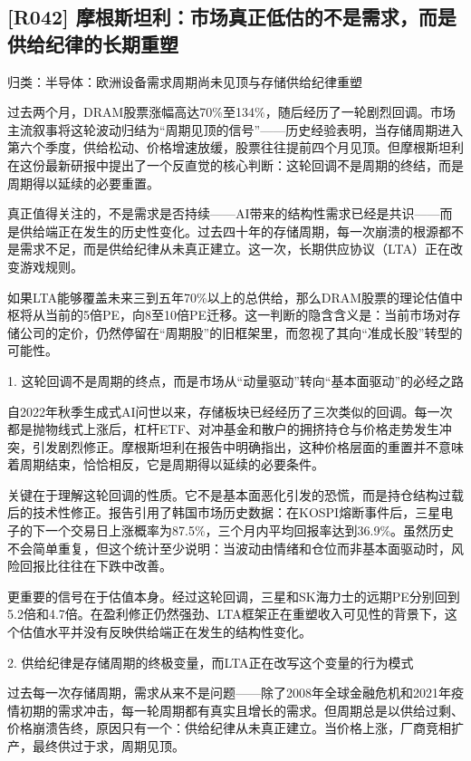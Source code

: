 \documentclass[11pt]{ctexart}
\begin{document}
\subsection{[R042] 摩根斯坦利：市场真正低估的不是需求，而是供给纪律的长期重塑}
{\small\color{refgray}归类：半导体：欧洲设备需求周期尚未见顶与存储供给纪律重塑}

过去两个月，DRAM股票涨幅高达70\%至134\%，随后经历了一轮剧烈回调。市场主流叙事将这轮波动归结为“周期见顶的信号”——历史经验表明，当存储周期进入第六个季度，供给松动、价格增速放缓，股票往往提前四个月见顶。但摩根斯坦利在这份最新研报中提出了一个反直觉的核心判断：这轮回调不是周期的终结，而是周期得以延续的必要重置。

真正值得关注的，不是需求是否持续——AI带来的结构性需求已经是共识——而是供给端正在发生的历史性变化。过去四十年的存储周期，每一次崩溃的根源都不是需求不足，而是供给纪律从未真正建立。这一次，长期供应协议（LTA）正在改变游戏规则。

如果LTA能够覆盖未来三到五年70\%以上的总供给，那么DRAM股票的理论估值中枢将从当前的5倍PE，向8至10倍PE迁移。这一判断的隐含含义是：当前市场对存储公司的定价，仍然停留在“周期股”的旧框架里，而忽视了其向“准成长股”转型的可能性。

1. 这轮回调不是周期的终点，而是市场从“动量驱动”转向“基本面驱动”的必经之路

自2022年秋季生成式AI问世以来，存储板块已经经历了三次类似的回调。每一次都是抛物线式上涨后，杠杆ETF、对冲基金和散户的拥挤持仓与价格走势发生冲突，引发剧烈修正。摩根斯坦利在报告中明确指出，这种价格层面的重置并不意味着周期结束，恰恰相反，它是周期得以延续的必要条件。

关键在于理解这轮回调的性质。它不是基本面恶化引发的恐慌，而是持仓结构过载后的技术性修正。报告引用了韩国市场历史数据：在KOSPI熔断事件后，三星电子的下一个交易日上涨概率为87.5\%，三个月内平均回报率达到36.9\%。虽然历史不会简单重复，但这个统计至少说明：当波动由情绪和仓位而非基本面驱动时，风险回报比往往在下跌中改善。

更重要的信号在于估值本身。经过这轮回调，三星和SK海力士的远期PE分别回到5.2倍和4.7倍。在盈利修正仍然强劲、LTA框架正在重塑收入可见性的背景下，这个估值水平并没有反映供给端正在发生的结构性变化。

2. 供给纪律是存储周期的终极变量，而LTA正在改写这个变量的行为模式

过去每一次存储周期，需求从来不是问题——除了2008年全球金融危机和2021年疫情初期的需求冲击，每一轮周期都有真实且增长的需求。但周期总是以供给过剩、价格崩溃告终，原因只有一个：供给纪律从未真正建立。当价格上涨，厂商竞相扩产，最终供过于求，周期见顶。
\end{document}

